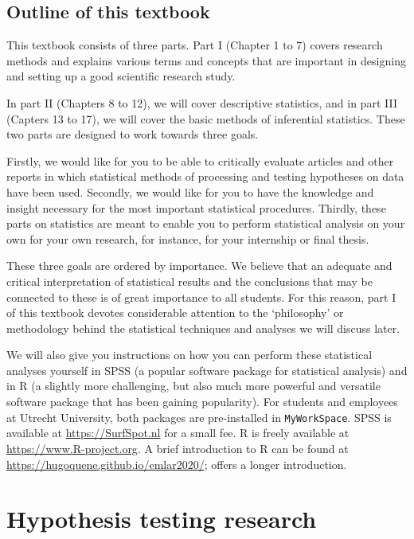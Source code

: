 \documentclass[
]{book}
\begin{document}
\hypertarget{outline-of-this-textbook}{%
\section{Outline of this textbook}\label{outline-of-this-textbook}}

This textbook consists of three parts. Part I (Chapter 1 to 7) covers research methods and explains various terms and concepts that are important in designing and setting up a good scientific research study.

In part II (Chapters 8 to 12), we will cover descriptive statistics, and in part III (Capters 13 to 17), we will cover the basic methods of inferential statistics. These two parts are designed to work towards three goals.

Firstly, we would like for you to be able to critically evaluate articles and other reports in which statistical methods of processing and testing hypotheses on data have been used.
Secondly, we would like for you to have the knowledge and insight necessary for the most important statistical procedures. Thirdly, these parts on statistics are meant to enable you to perform statistical analysis on your own for your own research, for instance, for your internship or final thesis.

These three goals are ordered by importance. We believe that an adequate and critical interpretation of statistical results and the conclusions that may be connected to these is of great importance to all students. For this reason, part I of this textbook devotes considerable attention to the `philosophy' or methodology behind the statistical techniques and analyses we will discuss later.

We will also give you instructions on how you can perform these statistical analyses yourself in SPSS (a popular software package for statistical analysis) and in R (a slightly more challenging, but also much more powerful and versatile software package that has been gaining popularity).
For students and employees at Utrecht University, both packages are pre-installed in \texttt{MyWorkSpace}. SPSS is available at \url{https://SurfSpot.nl} for a small fee.
R is freely available at \url{https://www.R-project.org}.
A brief introduction to R can be found at \url{https://hugoquene.github.io/emlar2020/};
\citet{Dalg02} offers a longer introduction.

\hypertarget{ch:research}{%
\chapter{Hypothesis testing research}\label{ch:research}}
\end{document}

